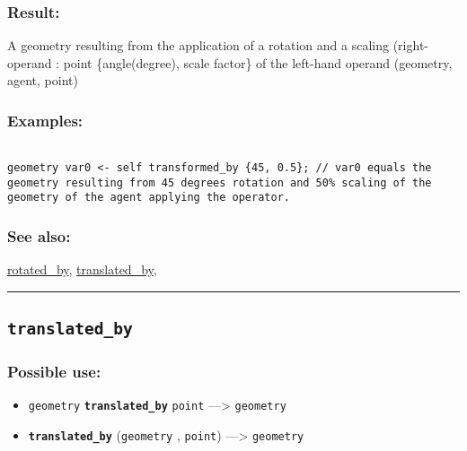 \documentclass[]{book}
\providecommand{\tightlist}{%
  \setlength{\itemsep}{0pt}\setlength{\parskip}{0pt}}
\theoremstyle{definition}
\theoremstyle{definition}
\theoremstyle{definition}
\theoremstyle{remark}
\begin{document}
\subsubsection{Result:}\label{result-512}

A geometry resulting from the application of a rotation and a scaling
(right-operand : point \{angle(degree), scale factor\} of the left-hand
operand (geometry, agent, point)

\subsubsection{Examples:}\label{examples-367}

\begin{verbatim}
 
geometry var0 <- self transformed_by {45, 0.5}; // var0 equals the geometry resulting from 45 degrees rotation and 50% scaling of the geometry of the agent applying the operator.
\end{verbatim}

\subsubsection{See also:}\label{see-also-209}

\href{operators-n-to-r.html\#rotated_by}{rotated\_by},
\href{operators-s-to-z.html\#translated_by}{translated\_by},

\begin{center}\rule{0.5\linewidth}{\linethickness}\end{center}

\subsection{\texorpdfstring{\texttt{translated\_by}}{translated\_by}}\label{translated_by}

\subsubsection{Possible use:}\label{possible-use-531}

\begin{itemize}
\tightlist
\item
  \texttt{geometry} \textbf{\texttt{translated\_by}} \texttt{point}
  ---\textgreater{} \texttt{geometry}
\item
  \textbf{\texttt{translated\_by}} (\texttt{geometry} , \texttt{point})
  ---\textgreater{} \texttt{geometry}
\end{itemize}
\end{document}
